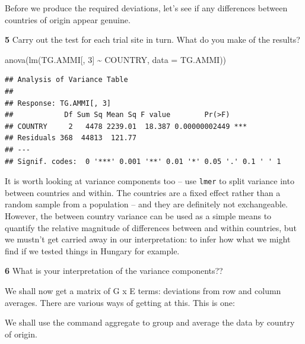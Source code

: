 \documentclass[
]{book}
\makeatletter
\newenvironment{Shaded}{\begin{snugshade}}{\end{snugshade}}
\newcommand{\AttributeTok}[1]{\textcolor[rgb]{0.77,0.63,0.00}{#1}}
\newcommand{\DecValTok}[1]{\textcolor[rgb]{0.00,0.00,0.81}{#1}}
\newcommand{\FunctionTok}[1]{\textcolor[rgb]{0.00,0.00,0.00}{#1}}
\newcommand{\NormalTok}[1]{#1}
\newcommand{\OtherTok}[1]{\textcolor[rgb]{0.56,0.35,0.01}{#1}}
\newcommand{\SpecialCharTok}[1]{\textcolor[rgb]{0.00,0.00,0.00}{#1}}
\newenvironment{kframe}{%
\medskip{}
\setlength{\fboxsep}{.8em}
 \def\at@end@of@kframe{}%
 \ifinner\ifhmode%
  \def\at@end@of@kframe{\end{minipage}}%
  \begin{minipage}{\columnwidth}%
 \fi\fi%
 \def\FrameCommand##1{\hskip\@totalleftmargin \hskip-\fboxsep
 \colorbox{shadecolor}{##1}\hskip-\fboxsep
     \hskip-\linewidth \hskip-\@totalleftmargin \hskip\columnwidth}%
 \MakeFramed {\advance\hsize-\width
   \@totalleftmargin\z@ \linewidth\hsize
   \@setminipage}}%
 {\par\unskip\endMakeFramed%
 \at@end@of@kframe}
\newenvironment{rmdblock}[1]
  {
  \begin{itemize}
  \renewcommand{\labelitemi}{
    \raisebox{-.7\height}[0pt][0pt]{
      {\setkeys{Gin}{width=3em,keepaspectratio}\texttt{[image: images/\#1]}}
    }
  }
  \setlength{\fboxsep}{1em}
  \begin{kframe}
  \item
  }
  {
  \end{kframe}
  \end{itemize}
  }
\newenvironment{rmdquiz}
  {\begin{rmdblock}{quiz}}
  {\end{rmdblock}}
\makeatother
\begin{document}
Before we produce the required deviations, let's see if any differences between countries of origin appear genuine.

\begin{rmdquiz}
\textbf{5}
Carry out the test for each trial site in turn. What do you make of the results?
\end{rmdquiz}

\begin{Shaded}
\begin{Highlighting}[]
\FunctionTok{anova}\NormalTok{(}\FunctionTok{lm}\NormalTok{(TG.AMMI[, }\DecValTok{3}\NormalTok{] }\SpecialCharTok{\textasciitilde{}}\NormalTok{ COUNTRY, }\AttributeTok{data =}\NormalTok{ TG.AMMI))}
\end{Highlighting}
\end{Shaded}

\begin{verbatim}
## Analysis of Variance Table
## 
## Response: TG.AMMI[, 3]
##            Df Sum Sq Mean Sq F value        Pr(>F)    
## COUNTRY     2   4478 2239.01  18.387 0.00000002449 ***
## Residuals 368  44813  121.77                          
## ---
## Signif. codes:  0 '***' 0.001 '**' 0.01 '*' 0.05 '.' 0.1 ' ' 1
\end{verbatim}

It is worth looking at variance components too -- use \texttt{lmer} to split variance into between countries and within. The countries are a fixed effect rather than a random sample from a population -- and they are definitely not exchangeable. However, the between country variance can be used as a simple means to quantify the relative magnitude of differences between and within countries, but we mustn't get carried away in our interpretation: to infer how what we might find if we tested things in Hungary for example.

\begin{rmdquiz}
\textbf{6}
What is your interpretation of the variance components??
\end{rmdquiz}

We shall now get a matrix of G x E terms: deviations from row and column averages. There are various ways of getting at this. This is one:

We shall use the command aggregate to group and average the data by country of origin.

\begin{Shaded}
\end{Shaded}
\end{document}
